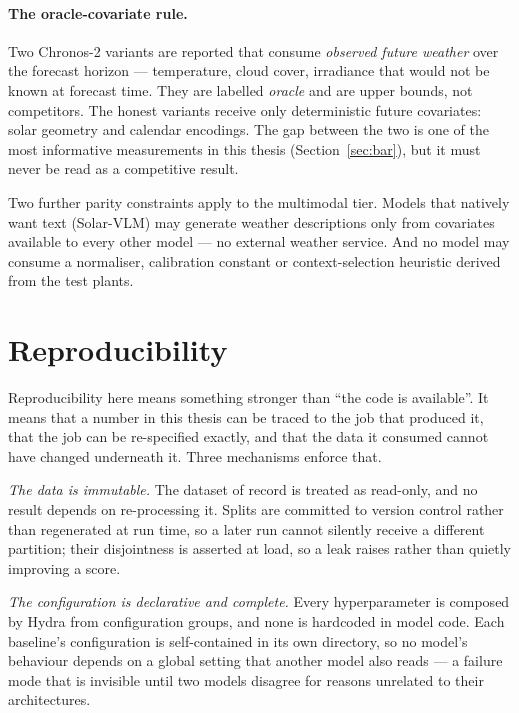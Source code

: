 \paragraph{The oracle-covariate rule.} Two Chronos-2 variants are reported that consume
\emph{observed future weather} over the forecast horizon --- temperature, cloud cover,
irradiance that would not be known at forecast time. They are labelled \emph{oracle} and
are upper bounds, not competitors. The honest variants receive only deterministic future
covariates: solar geometry and calendar encodings. The gap between the two is one of the
most informative measurements in this thesis (Section~\ref{sec:bar}), but it must
never be read as a competitive result.

Two further parity constraints apply to the multimodal tier. Models that natively want text
(Solar-VLM) may generate weather descriptions only from covariates available to every other
model --- no external weather service. And no model may consume a normaliser, calibration
constant or context-selection heuristic derived from the test plants.

\section{Reproducibility}
\label{sec:reproducibility}

Reproducibility here means something stronger than ``the code is available''. It means that a
number in this thesis can be traced to the job that produced it, that the job can be
re-specified exactly, and that the data it consumed cannot have changed underneath it. Three
mechanisms enforce that.

\emph{The data is immutable.} The dataset of record is treated as read-only, and no result
depends on re-processing it. Splits are committed to version control rather than regenerated
at run time, so a later run cannot silently receive a different partition; their disjointness
is asserted at load, so a leak raises rather than quietly improving a score.

\emph{The configuration is declarative and complete.} Every hyperparameter is composed by
Hydra from configuration groups, and none is hardcoded in model code. Each baseline's
configuration is self-contained in its own directory, so no model's behaviour depends on a
global setting that another model also reads --- a failure mode that is invisible until two
models disagree for reasons unrelated to their architectures.

